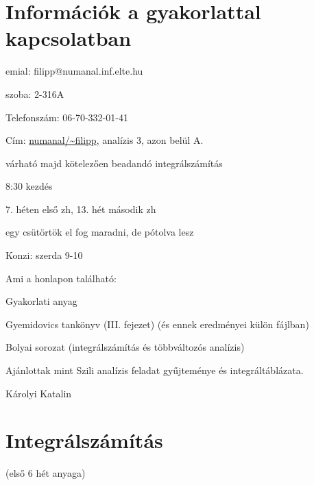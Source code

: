 \documentclass[a4paper,11.5pt]{article}
\begin{document}
	\section{Információk a gyakorlattal kapcsolatban}
	\begin{compactitem}
		\item emial: filipp@numanal.inf.elte.hu
		\item szoba: 2-316A
		\item Telefonszám: 06-70-332-01-41
		\item Cím: \url{numanal/~filipp}, analízis 3, azon belül A.
		\item várható majd kötelezően beadandó integrálszámítás
		\item 8:30 kezdés
		\item 7. héten első zh, 13. hét második zh
		\item egy csütörtök el fog maradni, de pótolva lesz
		\item Konzi: szerda 9-10
	\end{compactitem}
	Ami a honlapon található:
	\begin{compactitem}
		\item Gyakorlati anyag
		\item Gyemidovics tankönyv (III. fejezet) (és ennek eredményei külön fájlban)
		\item Bolyai sorozat (integrálszámítás és többváltozós analízis)
		\item Ajánlottak mint Szili analízis feladat gyűjteménye és integráltáblázata.
		\item Károlyi Katalin
	\end{compactitem}
	\section{Integrálszámítás}
	(első 6 hét anyaga)
\end{document}
